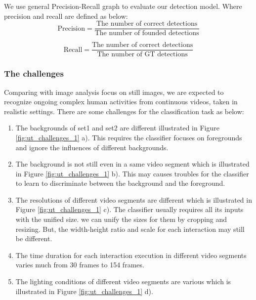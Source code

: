 \par 
We use general Precision-Recall graph to evaluate our detection model. Where precision and recall are defined as below:
\begin{equation*}
\text{Precision} = \frac{\text{The number of correct detections}}{\text{The number of founded detections}}
\end{equation*}

\begin{equation*}
\text{Recall} = \frac{\text{The number of correct detections}}{\text{The number of GT detections}}
\end{equation*}

\subsubsection*{The challenges} 
Comparing with image analysis focus on still images, we are expected to recognize ongoing complex human activities from continuous videos, taken in realistic settings. There are some challenges for the classification task as below:
\begin{enumerate}
	\item The backgrounds of set1 and set2 are different illustrated in Figure \ref{fig:ut_challenges_1} a). This requires the classifier focuses on foregrounds and ignore the influences of different backgrounds. 
	\item The background is not still even in a same video segment which is illustrated in Figure \ref{fig:ut_challenges_1} b). This may causes troubles for the classifier to learn to discriminate between the background and the foreground.    
	\item The resolutions of different video segments are different which is illustrated in Figure \ref{fig:ut_challenges_1} c). The classifier usually requires all its inputs with the unified size. we can unify the sizes for them by cropping and resizing. But, the width-height ratio and scale for each interaction may still be different. 
	\item The time duration for each interaction execution in different video segments varies much from 30 frames to 154 frames.
	\item The lighting conditions of different video segments are various which is illustrated in Figure \ref{fig:ut_challenges_1} d).  
\end{enumerate} 
